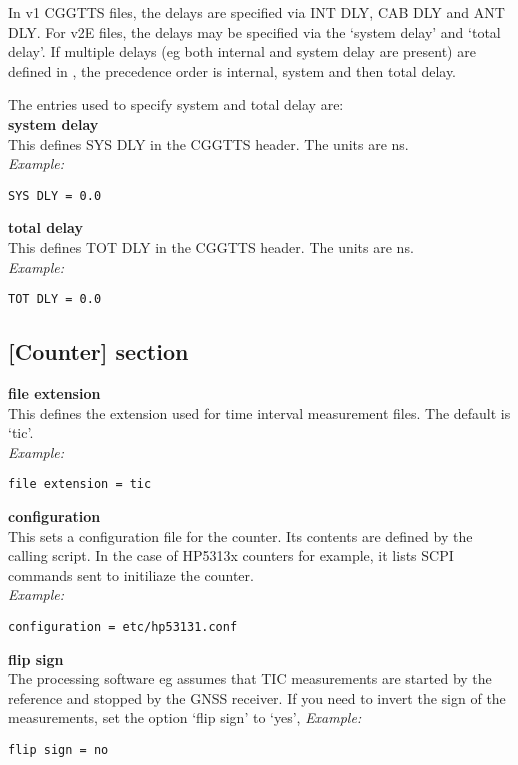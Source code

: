 In v1 CGGTTS files, the delays are specified via INT DLY, CAB DLY and ANT DLY.  
For v2E files, the delays may be specified via the `system delay' and `total delay'.
If multiple delays (eg both internal and system delay are present) are defined in
, the precedence order is internal, system and then total delay.

The entries used to specify system and total delay are:\\

{\bfseries system delay}\\
This defines SYS DLY in the CGGTTS header. The units are ns.\\
\textit{Example:}
\begin{lstlisting}
SYS DLY = 0.0
\end{lstlisting}

{\bfseries total delay}\\
This defines TOT DLY in the CGGTTS header. The units are ns.\\
\textit{Example:}
\begin{lstlisting}
TOT DLY = 0.0
\end{lstlisting}

\subsection{[Counter] section}

\hypertarget{h:counter}{}

{\bfseries file extension}\\
This defines the extension used for time interval measurement files.
The default is `tic'.\\
\textit{Example:}
\begin{lstlisting}
file extension = tic
\end{lstlisting}

{\bfseries configuration}\\ \hypertarget{h:counter_configuration}{}
This sets a configuration file for the counter. Its contents are defined by the calling script.
In the case of HP5313x counters for example,
it lists SCPI commands sent to initiliaze the counter.\\
\textit{Example:}
\begin{lstlisting}
configuration = etc/hp53131.conf
\end{lstlisting}

{\bfseries flip sign}\\
The processing software eg  assumes that TIC measurements are started by the reference
and stopped by the GNSS receiver. If you need to invert the sign of the measurements, set the option
`flip sign' to `yes',
\textit{Example:}
\begin{lstlisting}
flip sign = no 
\end{lstlisting}


